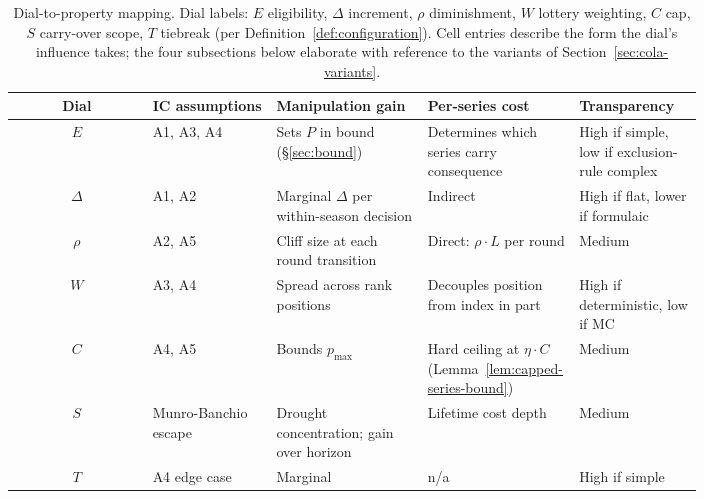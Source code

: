 \begin{table}[h]
\centering
\footnotesize
\setlength{\tabcolsep}{4pt}
\renewcommand{\arraystretch}{1.25}
\begin{tabular}{@{}c >{\raggedright\arraybackslash}p{0.18\linewidth} >{\raggedright\arraybackslash}p{0.22\linewidth} >{\raggedright\arraybackslash}p{0.22\linewidth} >{\raggedright\arraybackslash}p{0.18\linewidth}@{}}
\toprule
\textbf{Dial} & \textbf{IC assumptions} & \textbf{Manipulation gain} & \textbf{Per-series cost} & \textbf{Transparency} \\
\midrule
$E$       & A1, A3, A4               & Sets $P$ in bound (\S\ref{sec:bound})            & Determines which series carry consequence       & High if simple, low if exclusion-rule complex \\
$\Delta$  & A1, A2                   & Marginal $\Delta$ per within-season decision     & Indirect                                          & High if flat, lower if formulaic              \\
$\rho$    & A2, A5                   & Cliff size at each round transition               & Direct: $\rho \cdot L$ per round                  & Medium                                         \\
$W$       & A3, A4                   & Spread across rank positions                       & Decouples position from index in part             & High if deterministic, low if MC               \\
$C$       & A4, A5                   & Bounds $p_{\max}$                                  & Hard ceiling at $\eta \cdot C$ (Lemma~\ref{lem:capped-series-bound}) & Medium       \\
$S$       & Munro-Banchio escape     & Drought concentration; gain over horizon         & Lifetime cost depth                                & Medium                                         \\
$T$       & A4 edge case             & Marginal                                           & n/a                                                & High if simple                                 \\
\bottomrule
\end{tabular}
\caption{Dial-to-property mapping. Dial labels: $E$ eligibility, $\Delta$ increment, $\rho$ diminishment, $W$ lottery weighting, $C$ cap, $S$ carry-over scope, $T$ tiebreak (per Definition~\ref{def:configuration}). Cell entries describe the form the dial's influence takes; the four subsections below elaborate with reference to the variants of Section~\ref{sec:cola-variants}.}
\label{tab:dial-properties}
\end{table}

